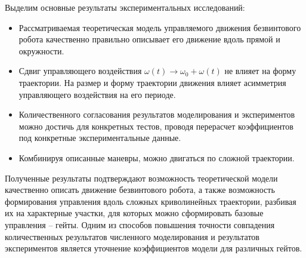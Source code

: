 Выделим основные результаты экспериментальных исследований:

\begin{itemize}
	\item Рассматриваемая теоретическая модель управляемого движения безвинтового робота качественно правильно  описывает его движение вдоль прямой и окружности. %
	
	\item Сдвиг управляющего воздействия $\omega(t) \rightarrow \omega_0 + \omega(t)$ не влияет на форму траектории. На размер и форму траектории движения влияет асимметрия управляющего воздействия на его периоде.
	
	\item Количественного согласования результатов моделирования и экспериментов можно достичь для конкретных тестов, проводя перерасчет коэффициентов под конкретные экспериментальные данные.
	
	\item Комбинируя описанные маневры, можно двигаться по сложной траектории.
	
	
\end{itemize}



Полученные результаты подтверждают возможность теоретической модели качественно описать движение безвинтового робота, а также возможность формирования управления вдоль сложных криволинейных траектории, разбивая их на характерные участки, для которых можно сформировать базовые управления -- гейты. Одним из способов повышения точности совпадения количественных результатов численного моделирования и результатов экспериментов является уточнение коэффициентов модели для различных гейтов.

